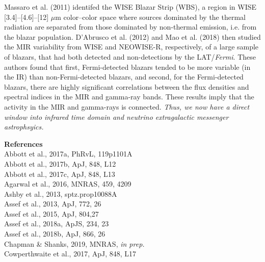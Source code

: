 \documentclass[12pt]{article}
\begin{document}
\smallskip
\smallskip
\noindent
Massaro et al. (2011) identifed the WISE Blazar Strip (WBS), a region in WISE [3.4]–[4.6]–[12] $\mu$m color–color space where sources dominated by the thermal radiation are separated from those dominated by non-thermal emission, i.e. from the blazar population. D'Abrusco et al. (2012) and Mao et al. (2018) then studied the MIR variability from WISE and NEOWISE-R, respectively, of a large sample of blazars, that had both detected and non-detections by the LAT/{\it Fermi}. These authors found that first, Fermi-detected blazars tended to be more variable (in the IR) than non-Fermi-detected blazars, and second, for the Fermi-detected blazars, there are highly significant correlations between the flux densities and spectral indices in the MIR and gamma-ray bands. These results imply that the activity in the MIR and gamma-rays is connected. 
{\it Thus, we now have a direct window into infrared time domain and neutrino extragalactic messenger astrophsyics.}



\hspace{-78pt}

\smallskip
\smallskip
\noindent
%



\pagebreak
\textbf{References} \\
Abbott et al., 2017a,  PhRvL, 119p1101A	\\
Abbott et al., 2017b, ApJ, 848, L12	\\
Abbott et al., 2017c, ApJ, 848, L13	\\
Agarwal et al., 2016,  MNRAS, 459, 4209 \\
Ashby et al., 2013, sptz.prop10088A \\
Assef et al., 2013, ApJ, 772, 26      \\       %
Assef et al., 2015,  ApJ, 804,27 \\            %
Assef et al., 2018a,  ApJS, 234, 23	\\     %
Assef et al., 2018b, ApJ, 866, 26 \\          %
Chapman \& Shanks, 2019, MNRAS, {\it in prep.} \\
Cowperthwaite et al., 2017,  ApJ, 848, L17	\\
\end{document}
